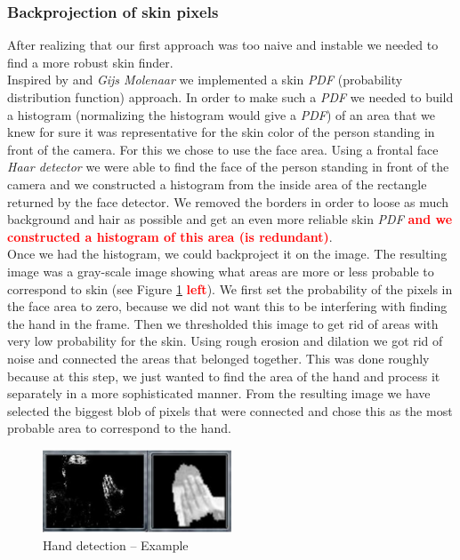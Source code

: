 \documentclass[a4paper, 11pt, twocolumn]{article}
\newcommand{\todo}[1]{\textcolor{red}{\textbf{#1}}}
\begin{document}
		\subsubsection{Backprojection of skin pixels}
       	After realizing that our first approach was too naive and instable we needed to find a more robust skin finder.\\
       \hspace*{10px} Inspired by \cite{IMS} and \emph{Gijs Molenaar} we implemented a skin \emph{PDF} (probability distribution function) approach. In order to make such a \emph{PDF} we needed to build a histogram (normalizing the histogram would give a \emph{PDF}) of an area that we knew for sure it was representative for the skin color of the person standing in front of the camera. For this we chose to use the face area. Using a frontal face \emph{Haar detector} we were able to find the face of the person standing in front of the camera and we constructed a histogram from the inside area of the rectangle returned by the face detector. We removed the borders in order to loose as much background and hair as possible and get an even more reliable skin \emph{PDF} \todo{and we constructed a histogram of this area (is redundant)}.\\
       \hspace*{10px} Once we had the histogram, we could backproject it on the image. The resulting image was a gray-scale image showing what areas are more or less probable to correspond to skin (see Figure \ref{img:skinProb} \todo{left}). We first set the probability of the pixels in the face area to zero, because we did not want this to be interfering with finding the hand in the frame. Then we thresholded this image to get rid of areas with very low probability for the skin. Using rough erosion and dilation we got rid of noise and connected the areas that belonged together. This was done roughly because at this step, we just wanted to find the area of the hand and process it separately in a more sophisticated manner. From the resulting image we have selected the biggest blob of pixels that were connected and chose this as the most probable area to correspond to the hand.\\
		\begin{figure}[!hbtp]
		   \centering
		   \includegraphics[width=0.5\textwidth]{hands.png}
			\caption{Hand detection -- Example}
			\label{img:skinProb}
	   	\end{figure}	
\end{document}
